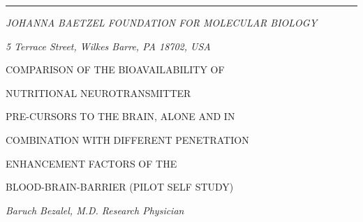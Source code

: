 \documentclass[10pt]{memoir}
\begin{document}
\noindent\rule{\textwidth}{0.4pt}\par

\bigskip

\noindent\textit{JOHANNA BAETZEL FOUNDATION FOR MOLECULAR BIOLOGY}

\noindent\textit{5 Terrace Street, Wilkes Barre, PA 18702, USA}

\bigskip

\begin{center}
	{\pragmatica\Large%
		COMPARISON OF THE BIOAVAILABILITY OF

		NUTRITIONAL NEUROTRANSMITTER

		PRE-CURSORS TO THE BRAIN, ALONE AND IN

		COMBINATION WITH DIFFERENT PENETRATION

		ENHANCEMENT FACTORS OF THE

		BLOOD-BRAIN-BARRIER (PILOT SELF STUDY)%
	}

	\bigskip

	\textit{Baruch Bezalel, M.D. Research Physician}
\end{center}
\end{document}

